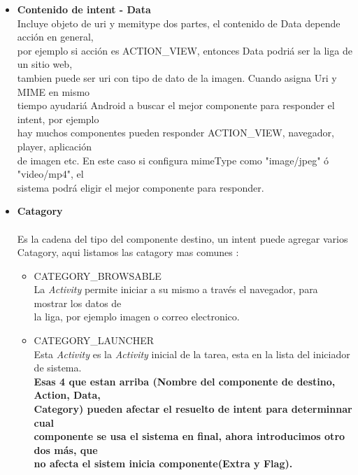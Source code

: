 \documentclass[a4paper]{article}
\begin{document}
\begin{itemize}
\item \textbf{Contenido de intent - Data} \\[-0.2em]

Incluye objeto de uri y memitype dos partes, el contenido de Data depende acción en general,\\[0.3em] por ejemplo si acción es ACTION\_VIEW, entonces Data  podriá ser la liga de un sitio web, \\[0.3em]tambien puede ser uri con tipo de dato de la imagen.
Cuando asigna Uri y MIME en mismo \\[0.3em] tiempo ayudariá Android a buscar el mejor componente para responder el intent, por ejemplo \\[0.3em] hay muchos componentes pueden responder ACTION\_VIEW, navegador, player, aplicación \\[0.3em] de imagen etc. En este caso si configura mimeType como "image/jpeg" ó "video/mp4", el \\[0.3em] sistema podrá eligir el mejor componente para responder. \\

\end{itemize}


\begin{itemize}
\item \textbf{Catagory} \\ \\
Es la cadena del tipo del componente destino, un intent puede agregar varios Catagory, aqui listamos las catagory mas comunes :

\begin{itemize}
  \item{CATEGORY\_BROWSABLE}  \\[0.6em] 
La \textit{Activity} permite iniciar a su mismo a través el navegador, para mostrar los datos de  \\[0.3em]  la liga, por ejemplo imagen o correo electronico. \\ 
   \item{CATEGORY\_LAUNCHER}  \\[0.6em]
Esta \textit{Activity} es la \textit{Activity} inicial de la tarea, esta en la lista del iniciador de sistema.  \\[0.6em]

\textbf {Esas 4 que estan arriba (Nombre del componente de destino, Action, Data, \\[0.3em] Category) pueden afectar el resuelto de intent para determinnar cual \\[0.3em] componente se usa el sistema en final, ahora introducimos otro dos más, que \\[0.3em] no afecta el sistem inicia componente(Extra y Flag).} \\
\end{itemize}

\end{itemize}
\end{document}
